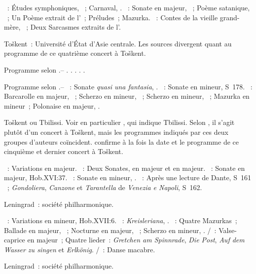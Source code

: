 \begin{description}
 \textsc{\Schumann{}}~: Études symphoniques, ~; Carnaval, .
 \textsc{\Scriabine{}}~: Sonate  en \kF \Sharp majeur, ~;
 Poème satanique, ~; Un Poème extrait de l'~; Préludes~;
 Mazurka.
 \textsc{\Prokofiev{}}~: Contes de la vieille grand-mère, ~; Deux
 Sarcasmes extraits de l'.
 \item[\DateWithWeekDay{1932-10-06}]
 Toškent~: Université d'\hbox{État} d'\hbox{Asie} centrale.
 Les sources divergent quant au programme de ce quatrième concert à Toškent.

 Programme selon \citet[p.~405]{Scriabine}.--
 \textsc{\Mendelssohn{}}.
 \textsc{\Haydn{}}.
 \textsc{\Schumann{}}.
 \textsc{\Prokofiev{}}.
 \textsc{\Scriabine{}}.

 Programme selon \citet[p.~155]{Nekrasova08}.--
 \textsc{\Beethoven{}}~: Sonate \emph{quasi una fantasia}, .
 \textsc{\Liszt{}}~: Sonate en \kB mineur, S~178.
 \textsc{\Chopin{}}~: Barcarolle en \kF \Sharp majeur, ~; Scherzo
 en \kB \Flat mineur, ~; Scherzo en \kC \Sharp mineur, ~;
 Mazurka en \kC \Sharp mineur~; Polonaise en \kA \Flat majeur, .
 \item[\DateWithWeekDay{1932-10-10}]
 Toškent ou Tbilissi.
 Voir en particulier \citet[p.~427]{Milshteyn82a}, qui indique Tbilissi.
 Selon \citet[p.~405]{Scriabine}, il s'agit plutôt d'un concert à Toškent,
 mais les programmes indiqués par ces deux groupes d'auteurs coïncident.
 \citet[p.~155]{Nekrasova08} confirme à la fois la date et le programme de
 ce cinquième et dernier concert à Toškent.

 \textsc{\Haendel{}}~: Variations en \kE majeur.
 \textsc{\Scarlatti{}}~: Deux Sonates, en \kA majeur et en \kD majeur.
 \textsc{\Haydn{}}~: Sonate en \kD majeur, Hob.XVI:37.
 \textsc{\Chopin{}}~: Sonate en \kB mineur, .
 \textsc{\Liszt{}}~: Après une lecture de Dante, S~161 ~;
 \emph{Gondoliera}, \emph{Canzone} et \emph{Tarantella} de \emph{Venezia e
 Napoli}, S~162.
 \item[\DateWithWeekDay{1932-10-24}]
 Leningrad~: société philharmonique.

 \textsc{\Haydn{}}~: Variations en \kF mineur, Hob.XVII:6.
 \textsc{\Schumann{}}~: \emph{Kreisleriana}, .
 \textsc{\Chopin{}}~: Quatre Mazurkas~; Ballade en \kA \Flat majeur,
 ~; Nocturne en \kF majeur,  ~; Scherzo en \kC
 \Sharp mineur, .
 \textsc{\Schubert{}/\Liszt{}}~: Valse-caprice en \kA majeur~; Quatre
 lieder~: \emph{Gretchen am Spinnrade}, \emph{Die Post}, \emph{Auf dem
 Wasser zu singen} et \emph{Erlkönig}.
 \textsc{\SaintSaens{}/\Liszt{}}~: Danse macabre.
 \item[\DateWithWeekDay{1932-11-24}]
 Leningrad~: société philharmonique.


\end{description}
